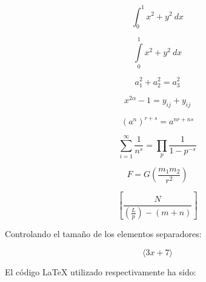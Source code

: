 \documentclass[12pt,a4paper,oneside,]{book}
\numberwithin{dummy}{section}
\theoremstyle{ocrenumbox}
\theoremstyle{blacknumex}
\theoremstyle{blacknumbox}
\theoremstyle{ocrenum}
\theoremstyle{ocrenum}
\begin{document}
\[ \int_0^1 x^2 + y^2 \ dx \]

\[ \int\limits_0^1 x^2 + y^2 \ dx \]

\[ a_1^2 + a_2^2 = a_3^2 \]

\[ x^{2 \alpha} - 1 = y_{ij} + y_{ij}  \]

\[ (a^n)^{r+s} = a^{nr+ns}  \]

\[ \sum_{i=1}^{\infty} \frac{1}{n^s} 
= \prod_p \frac{1}{1 - p^{-s}} \]

\[ 
F = G \left( \frac{m_1 m_2}{r^2} \right)
\]

\[ 
 \left[  \frac{ N } { \left( \frac{L}{p} \right)  - (m+n) }  \right]
\]

Controlando el tamaño de los elementos separadores:

\[
 \Bigg \langle 3x+7 \bigg \rangle
\]

El código LaTeX utilizado respectivamente ha sido:
\end{document}

